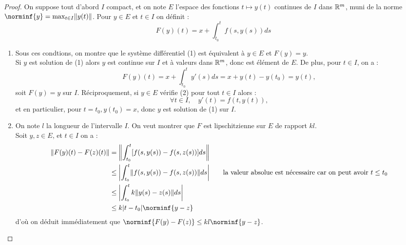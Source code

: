 \begin{proof}
On suppose tout d'abord $I$ compact, et on note $E$ l'espace des fonctions $t \mapsto y(t)$ continues de $I$ dans $\mathbb{R}^m$, 
muni de la norme $\norminf{y} = \max_{t \in I} \norm{y(t)}$. Pour $y \in E$ et $t \in I$ on définit :
\begin{equation}
F(y)(t) = x + \int_{t_0}^t f(s,y(s))ds 
\end{equation}
\begin{enumerate}[label=(\roman*)]
\item 
Sous ces condtions, on montre que le système différentiel (1) est équivalent à $y \in E$ et $F(y)=y$. \\
Si $y$ est solution de (1) alors $y$ est continue sur $I$ et à valeurs dans $\mathbb{R}^m$, donc est élément de $E$.
De plus, pour $t \in I$, on a :
\[ F(y)(t) = x + \int_{t_0}^t y'(s) ds = x + y(t) - y(t_0) = y(t) , \]
soit $F(y) = y$ sur $I$. Réciproquement, si $y \in E$ vérifie (2) pour tout $t \in I$ alors :
\[ \forall t \in I, \quad y'(t) = f(t, y(t)) , \]
et en particulier, pour $t=t_0, y(t_0) = x$, donc $y$ est solution de (1) sur $I$.

\item
On note $l$ la longueur de l'intervalle $I$. On veut montrer que $F$ est lipschitzienne sur $E$ de rapport $kl$. \\
Soit $y, z \in E$, et $t \in I$ on a :
\begin{align*}
\norm{F(y)(t) - F(z)(t)} & = \norm*{\int_{t_0}^t [ f(s, y(s)) - f(s, z(s)) ] ds} \\
& \leq \abs*{\int_{t_0}^t \norm*{ f(s, y(s)) - f(s, z(s)) } ds } \qquad \text{la valeur absolue est nécessaire car on peut avoir } t \leq t_0 \\
& \leq \abs*{\int_{t_0}^t k \norm{ y(s) - z(s) } ds } \\
& \leq k \abs{t-t_0} \norminf{y-z}
\end{align*}
d'où on déduit immédiatement que $\norminf{F(y)-F(z)} \leq kl \norminf{y-z}$.


\end{enumerate}
\end{proof}

